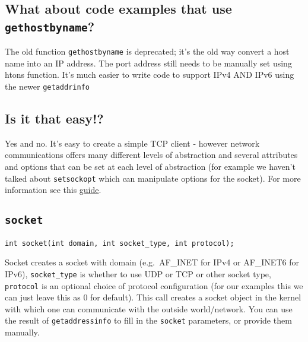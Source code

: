 \begin{Shaded}
\begin{Highlighting}[]
 
\NormalTok{, }

\end{Highlighting}
\end{Shaded}

\subsection{\texorpdfstring{What about code examples that use
\texttt{gethostbyname}?}{What about code examples that use gethostbyname?}}\label{what-about-code-examples-that-use-gethostbyname}

The old function \texttt{gethostbyname} is deprecated; it's the old way
convert a host name into an IP address. The port address still needs to
be manually set using htons function. It's much easier to write code to
support IPv4 AND IPv6 using the newer \texttt{getaddrinfo}

\subsection{Is it that easy!?}\label{is-it-that-easy}

Yes and no. It's easy to create a simple TCP client - however network
communications offers many different levels of abstraction and several
attributes and options that can be set at each level of abstraction (for
example we haven't talked about \texttt{setsockopt} which can manipulate
options for the socket). For more information see this
\href{http://www.beej.us/guide/bgnet/output/html/multipage/getaddrinfoman.html}{guide}.

\subsection{\texorpdfstring{\texttt{socket}}{socket}}\label{socket}

\texttt{int\ socket(int\ domain,\ int\ socket\_type,\ int\ protocol);}

Socket creates a socket with domain (e.g.~AF\_INET for IPv4 or AF\_INET6
for IPv6), \texttt{socket\_type} is whether to use UDP or TCP or other
socket type, \texttt{protocol} is an optional choice of protocol
configuration (for our examples this we can just leave this as 0 for
default). This call creates a socket object in the kernel with which one
can communicate with the outside world/network. You can use the result
of \texttt{getaddressinfo} to fill in the \texttt{socket} parameters, or
provide them manually.

